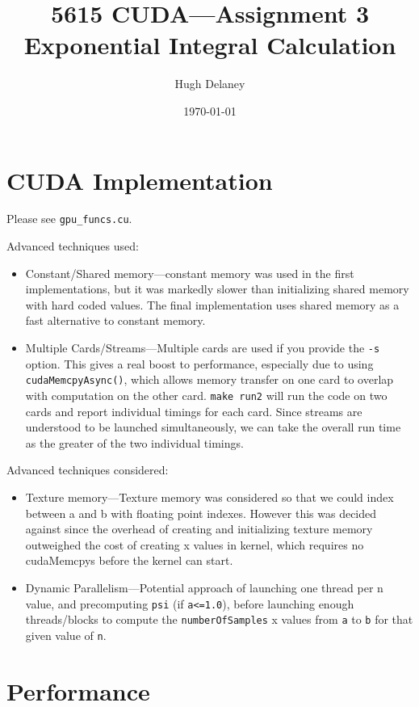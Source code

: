 \documentclass[a4paper, fleqn]{article}
\date{\today}
\author{Hugh Delaney}
\title{5615 CUDA---Assignment 3 \\ Exponential Integral Calculation}
\begin{document}
\maketitle
        \section{CUDA Implementation}%
        \label{sec:cuda_implementation}
        
        Please see \texttt{gpu\_funcs.cu}.

        Advanced techniques used:
        \begin{itemize}
                \item Constant/Shared memory---constant memory was used in the first implementations, but it was markedly slower than initializing shared memory with hard coded values. The final implementation uses shared memory as a fast alternative to constant memory.
                \item Multiple Cards/Streams---Multiple cards are used if you provide the \texttt{-s} option. This gives a real boost to performance, especially due to using \texttt{cudaMemcpyAsync()}, which allows memory transfer on one card to overlap with computation on the other card. \texttt{make run2} will run the code on two cards and report individual timings for each card. Since streams are understood to be launched simultaneously, we can take the overall run time as the greater of the two individual timings. 
        \end{itemize}

        Advanced techniques considered:
        \begin{itemize}
                \item Texture memory---Texture memory was considered so that we could index between a and b with floating point indexes. However this was decided against since the overhead of creating and initializing texture memory outweighed the cost of creating x values in kernel, which requires no cudaMemcpys before the kernel can start.
                \item Dynamic Parallelism---Potential approach of launching one thread per n value, and precomputing \texttt{psi} (if \texttt{a<=1.0}), before launching enough threads/blocks to compute the \texttt{numberOfSamples} x values from \texttt{a} to \texttt{b} for that given value of \texttt{n}. 
        \end{itemize}
\section{Performance}%
\label{sec:performance}
\end{document}
